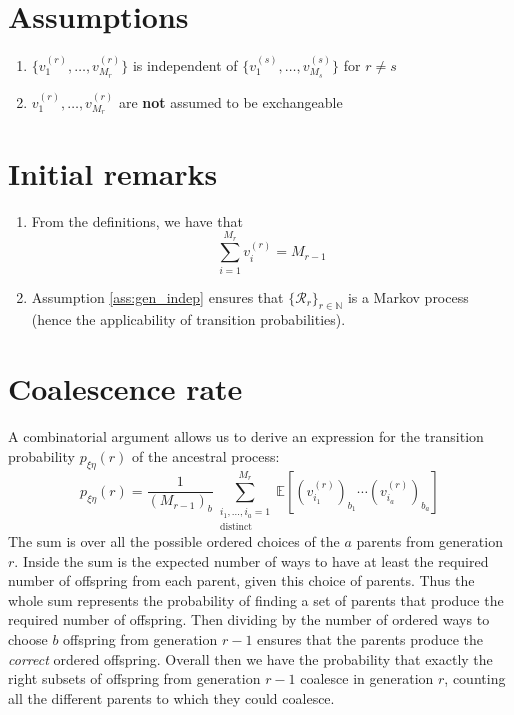 \documentclass{article}
\newcommand{\E}{\mathbb{E}}
\begin{document}
\section*{Assumptions}
\begin{enumerate}
\item\label{ass:gen_indep} $\{ v_1^{(r)},\dots,v_{M_r}^{(r)} \}$ is independent of $\{ v_1^{(s)},\dots,v_{M_s}^{(s)} \}$ for $r\neq s$
\item\label{ass:non_exch} $ v_1^{(r)},\dots,v_{M_r}^{(r)}$ are \textbf{not} assumed to be exchangeable
\end{enumerate}

\section*{Initial remarks}
\begin{enumerate}
\item From the definitions, we have that
\begin{equation}\label{eq:sum_vi}
\sum_{i=1}^{M_r} v_i^{(r)} = M_{r-1}
\end{equation}
\item Assumption \ref{ass:gen_indep} ensures that $\{\mathcal{R}_r\}_{r\in\mathbb{N}}$ is a Markov process (hence the applicability of transition probabilities).
\end{enumerate}

\section*{Coalescence rate}
A combinatorial argument allows us to derive an expression for the transition probability $p_{\xi\eta}(r)$ of the ancestral process:
\begin{equation}\label{eq:trans_prob}
p_{\xi\eta}(r) = \frac{1}{(M_{r-1})_b} \sum_{\substack{i_1,\dots,i_a =1 \\ \text{distinct}}}^{M_r} \E\left[(v_{i_1}^{(r)})_{b_1}\cdots (v_{i_a}^{(r)})_{b_a}\right]
\end{equation}
The sum is over all the possible ordered choices of the $a$ parents from generation $r$. Inside the sum is the expected number of ways to have at least the required number of offspring from each parent, given this choice of parents. Thus the whole sum represents the probability of finding a set of parents that produce the required number of offspring. Then dividing by the number of ordered ways to choose $b$ offspring from generation $r-1$ ensures that the parents produce the \emph{correct} ordered offspring. Overall then we have the probability that exactly the right subsets of offspring from generation $r-1$ coalesce in generation $r$, counting all the different parents to which they could coalesce.
\end{document}
